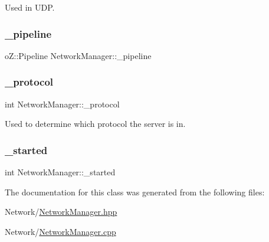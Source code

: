 Used in U\+DP. 

\mbox{\label{classNetworkManager_a63ace6e62f363661c718b17a738107dc}} 
\subsubsection{\texorpdfstring{\_pipeline}{\_pipeline}}
{\footnotesize\ttfamily o\+Z\+::\+Pipeline Network\+Manager\+::\+\_\+pipeline\hspace{0.3cm}{\ttfamily [private]}}

\mbox{\label{classNetworkManager_aa2c4503597d1a64439912f20a9799ec3}} 
\subsubsection{\texorpdfstring{\_protocol}{\_protocol}}
{\footnotesize\ttfamily int Network\+Manager\+::\+\_\+protocol\hspace{0.3cm}{\ttfamily [private]}}



Used to determine which protocol the server is in. 

\mbox{\label{classNetworkManager_acf160e0d3b59613ab6ff8084637a79ed}} 
\subsubsection{\texorpdfstring{\_started}{\_started}}
{\footnotesize\ttfamily int Network\+Manager\+::\+\_\+started\hspace{0.3cm}{\ttfamily [private]}}



The documentation for this class was generated from the following files\+:\begin{DoxyCompactItemize}
\item 
Network/\mbox{\hyperlink{NetworkManager_8hpp}{Network\+Manager.\+hpp}}\item 
Network/\mbox{\hyperlink{NetworkManager_8cpp}{Network\+Manager.\+cpp}}\end{DoxyCompactItemize}
